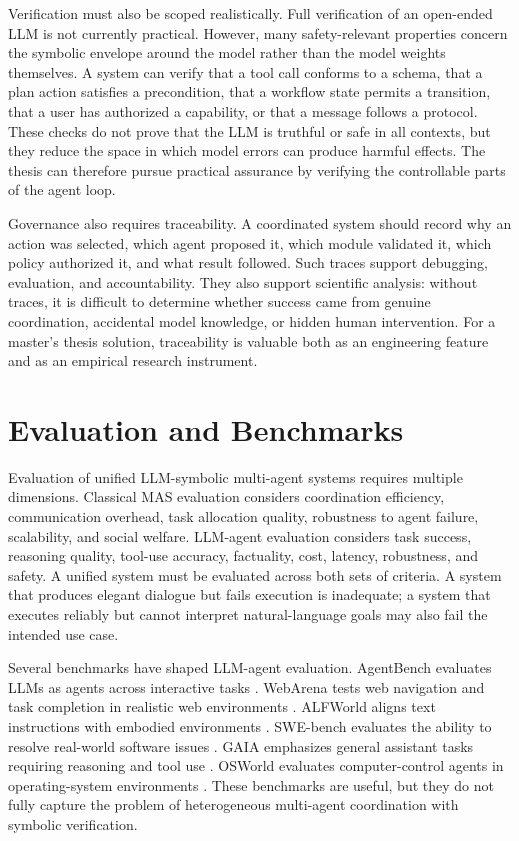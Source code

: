 Verification must also be scoped realistically. Full verification of an open-ended LLM is not currently practical. However, many safety-relevant properties concern the symbolic envelope around the model rather than the model weights themselves. A system can verify that a tool call conforms to a schema, that a plan action satisfies a precondition, that a workflow state permits a transition, that a user has authorized a capability, or that a message follows a protocol. These checks do not prove that the LLM is truthful or safe in all contexts, but they reduce the space in which model errors can produce harmful effects. The thesis can therefore pursue practical assurance by verifying the controllable parts of the agent loop.

Governance also requires traceability. A coordinated system should record why an action was selected, which agent proposed it, which module validated it, which policy authorized it, and what result followed. Such traces support debugging, evaluation, and accountability. They also support scientific analysis: without traces, it is difficult to determine whether success came from genuine coordination, accidental model knowledge, or hidden human intervention. For a master's thesis solution, traceability is valuable both as an engineering feature and as an empirical research instrument.

\section{Evaluation and Benchmarks}

Evaluation of unified LLM-symbolic multi-agent systems requires multiple dimensions. Classical MAS evaluation considers coordination efficiency, communication overhead, task allocation quality, robustness to agent failure, scalability, and social welfare. LLM-agent evaluation considers task success, reasoning quality, tool-use accuracy, factuality, cost, latency, robustness, and safety. A unified system must be evaluated across both sets of criteria. A system that produces elegant dialogue but fails execution is inadequate; a system that executes reliably but cannot interpret natural-language goals may also fail the intended use case.

Several benchmarks have shaped LLM-agent evaluation. AgentBench evaluates LLMs as agents across interactive tasks \cite{liu2023agentbench}. WebArena tests web navigation and task completion in realistic web environments \cite{zhou2023webarena}. ALFWorld aligns text instructions with embodied environments \cite{shridhar2021alfworld}. SWE-bench evaluates the ability to resolve real-world software issues \cite{jimenez2024swebench}. GAIA emphasizes general assistant tasks requiring reasoning and tool use \cite{mialon2023gaia}. OSWorld evaluates computer-control agents in operating-system environments \cite{xie2024osworld}. These benchmarks are useful, but they do not fully capture the problem of heterogeneous multi-agent coordination with symbolic verification.

